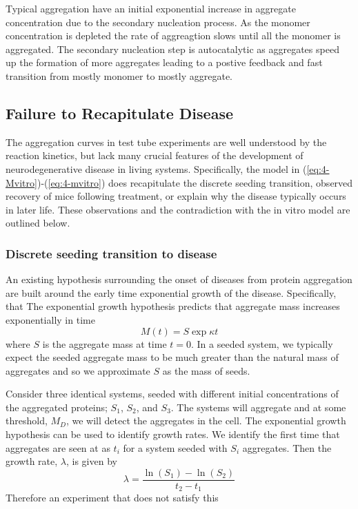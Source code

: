  Typical aggregation have an initial exponential increase in aggregate concentration due to the secondary nucleation process. As the monomer concentration is depleted the rate of aggreagtion slows until all the monomer is aggregated. The secondary nucleation step is autocatalytic as aggregates speed up the formation of more aggregates leading to a postive feedback and fast transition from mostly monomer to mostly aggregate.

\subsection{Failure to Recapitulate Disease}

The aggregation curves in test tube experiments are well understood by the reaction kinetics, but lack many crucial features of the development of neurodegenerative disease in living systems. Specifically, the model in (\ref{eq:4-Mvitro})-(\ref{eq:4-mvitro}) does recapitulate the discrete seeding transition, observed recovery of mice following treatment, or explain why the disease typically occurs in later life. These observations and the contradiction with the in vitro model are outlined below.

\subsubsection{Discrete seeding transition to disease}

An existing hypothesis surrounding the onset of diseases from protein aggregation are built around the early time exponential growth of the disease. Specifically, that 
The exponential growth hypothesis predicts that aggregate mass increases exponentially in time
\begin{equation}
    M(t) = S\exp{\kappa t}
\end{equation}
where $S$ is the aggregate mass at time $t=0$. In a seeded system, we typically expect the seeded aggregate mass to be much greater than the natural mass of aggregates and so we approximate $S$ as the mass of seeds.

Consider three identical systems, seeded with different initial concentrations of the aggregated proteins; $S_1$, $S_2$, and $S_3$. The systems will aggregate and at some threshold, $M_D$, we will detect the aggregates in the cell. The exponential growth hypothesis can be used to identify growth rates. We identify the first time that aggregates are seen at as $t_i$ for a system seeded with $S_i$ aggregates. Then the growth rate, $\lambda$, is given by
\begin{equation}
    \lambda = \frac{\ln(S_1)-\ln(S_2)}{t_2-t_1}
\end{equation}
Therefore an experiment that does not satisfy this

